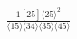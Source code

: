 \documentclass[varwidth, border=5pt]{standalone}
\begin{document}
\begin{my}
$\begin{gathered}
\scriptscriptstyle\frac{1[25]⟨25⟩^2}{⟨15⟩⟨34⟩⟨35⟩⟨45⟩}
\end{gathered}$
\end{my}
\end{document}
